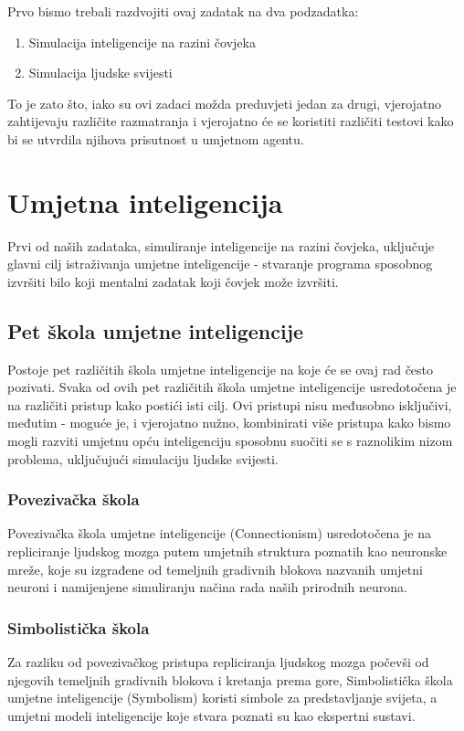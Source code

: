 \documentclass[diplomskirad]{fer}
\begin{document}
Prvo bismo trebali razdvojiti ovaj zadatak na dva podzadatka:
\begin{enumerate}
\item Simulacija inteligencije na razini čovjeka
\item Simulacija ljudske svijesti
\end{enumerate}

To je zato što, iako su ovi zadaci možda preduvjeti jedan za drugi, vjerojatno zahtijevaju različite razmatranja i vjerojatno će se koristiti različiti testovi kako bi se utvrdila njihova prisutnost u umjetnom agentu.
\section{Umjetna inteligencija}
Prvi od naših zadataka, simuliranje inteligencije na razini čovjeka, uključuje glavni cilj istraživanja umjetne inteligencije - stvaranje programa sposobnog izvršiti bilo koji mentalni zadatak koji čovjek može izvršiti.
\subsection{Pet škola umjetne inteligencije}
Postoje pet različitih škola umjetne inteligencije na koje će se ovaj rad često pozivati.
   Svaka od ovih pet različitih škola umjetne inteligencije usredotočena je na različiti pristup kako postići isti cilj. Ovi pristupi nisu međusobno isključivi, međutim - moguće je, i vjerojatno nužno, kombinirati više pristupa kako bismo mogli razviti umjetnu opću inteligenciju sposobnu suočiti se s raznolikim nizom problema, uključujući simulaciju ljudske svijesti.
\subsubsection{Povezivačka škola}
Povezivačka škola umjetne inteligencije (Connectionism) usredotočena je na repliciranje ljudskog mozga putem umjetnih struktura poznatih kao neuronske mreže, koje su izgrađene od temeljnih gradivnih blokova nazvanih umjetni neuroni i namijenjene simuliranju načina rada naših prirodnih neurona.
\subsubsection{Simbolistička škola}
Za razliku od povezivačkog pristupa repliciranja ljudskog mozga počevši od njegovih temeljnih gradivnih blokova i kretanja prema gore, Simbolistička škola umjetne inteligencije (Symbolism) koristi simbole za predstavljanje svijeta, a umjetni modeli inteligencije koje stvara poznati su kao ekspertni sustavi.
\end{document}
